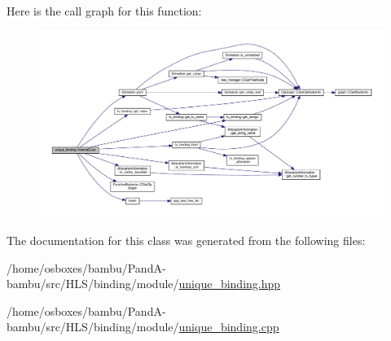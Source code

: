 Here is the call graph for this function\+:
\nopagebreak
\begin{figure}[H]
\begin{center}
\leavevmode
\includegraphics[width=350pt]{d4/d52/classunique__binding_a7d59ec7a2432423cb1e29fe246f73032_cgraph}
\end{center}
\end{figure}


The documentation for this class was generated from the following files\+:\begin{DoxyCompactItemize}
\item 
/home/osboxes/bambu/\+Pand\+A-\/bambu/src/\+H\+L\+S/binding/module/\hyperlink{unique__binding_8hpp}{unique\+\_\+binding.\+hpp}\item 
/home/osboxes/bambu/\+Pand\+A-\/bambu/src/\+H\+L\+S/binding/module/\hyperlink{unique__binding_8cpp}{unique\+\_\+binding.\+cpp}\end{DoxyCompactItemize}
